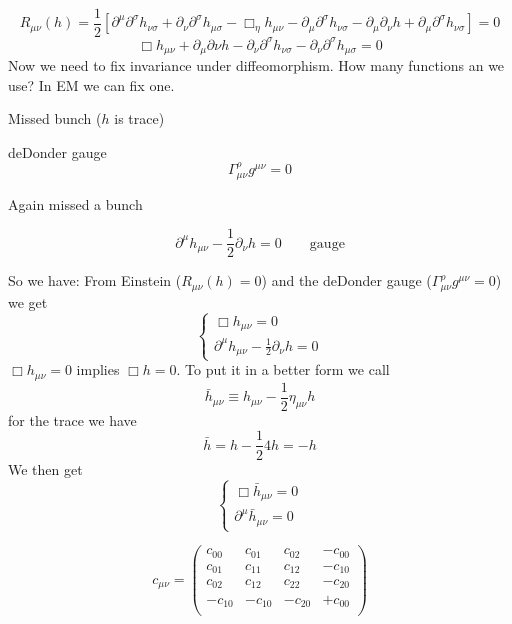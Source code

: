 \[ R_{\mu\nu}(h) = \frac{1}{2} \left[\partial^\mu\partial^\sigma h_{\nu\sigma} + \partial_\nu\partial^\sigma h_{\mu\sigma} - \Box_\eta h_{\mu\nu} - \partial_\mu\partial^\sigma h_{\nu\sigma} - \partial_\mu\partial_\nu h + \partial_\mu\partial^\sigma h_{\nu\sigma}\right] = 0 \]
\[ \boxed{\Box h_{\mu\nu} + \partial_\mu\partial\nu h - \partial_\nu\partial^\sigma h_{\nu\sigma} - \partial_\nu\partial^\sigma h_{\mu\sigma} = 0} \]
Now we need to fix invariance under diffeomorphism. How many functions an we use? In EM we can fix one.

Missed bunch ($h$ is trace)

deDonder gauge
\[ \boxed{\Gamma^\rho_{\mu\nu}g^{\mu\nu} = 0} \]

Again missed a bunch

\[ \boxed{\partial^\mu h_{\mu\nu} - \frac{1}{2}\partial_\nu h = 0} \qquad \text{gauge} \]

So we have:
From Einstein ($R_{\mu\nu}(h) = 0$) and the deDonder gauge ($\Gamma^\rho_{\mu\nu}g^{\mu\nu} = 0$) we get
\[ \begin{cases}
\Box h_{\mu\nu} = 0 \\ \partial^\mu h_{\mu\nu} - \frac{1}{2}\partial_\nu h = 0
\end{cases} \]
$\Box h_{\mu\nu} = 0$ implies $\Box h = 0$. To put it in a better form we call
\[ \bar{h}_{\mu\nu} \equiv h_{\mu\nu} - \frac{1}{2}\eta_{\mu\nu} h \]
for the trace we have
\[ \bar{h} = h - \frac{1}{2}4h = -h \]
We then get 
\[ \begin{cases}
\Box\bar{h}_{\mu\nu} = 0 \\ \partial^\mu \bar{h}_{\mu\nu} = 0
\end{cases} \]

\[ c_{\mu\nu} = \begin{pmatrix}
c_{00}&c_{01}&c_{02}&-c_{00} \\
c_{01}&c_{11}&c_{12}&-c_{10} \\
c_{02}&c_{12}&c_{22}&-c_{20} \\
-c_{10}&-c_{10}&-c_{20}&+c_{00} \\
\end{pmatrix} \]

